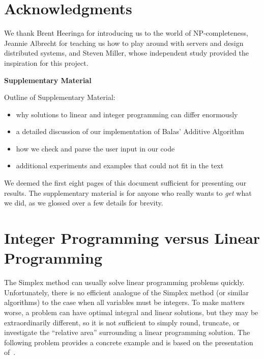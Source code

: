 \documentclass{article}
\begin{document}
\section*{Acknowledgments}
 
We thank Brent Heeringa for introducing us to the world of NP-completeness, Jeannie Albrecht for teaching us how to play around with servers and
design distributed systems, and Steven Miller, whose independent study provided the inspiration for this project.











\onecolumn

\appendix

\begin{center}
{\Large \textbf{Supplementary Material}}
\end{center}

Outline of Supplementary Material:

\begin{itemize}[noitemsep]
    \item why solutions to linear and integer programming can differ enormously
    \item a detailed discussion of our implementation of Balas' Additive Algorithm
    \item how we check and parse the user input in our code
    \item additional experiments and examples that could not fit in the text
\end{itemize}

We deemed the first eight pages of this document sufficient for presenting our results. The supplementary material is for anyone who really wants to
\emph{get} what we did, as we glossed over a few details for brevity.

\section{Integer Programming versus Linear Programming}\label{app:lin_vs_int}

The Simplex method can usually solve linear programming problems quickly. Unfortunately, there is no efficient analogue of the Simplex method (or
similar algorithms) to the case when all variables must be integers. To make matters worse, a problem can have optimal integral and linear solutions,
but they may be extraordinarily different, so it is not sufficient to simply round, truncate, or investigate the ``relative area'' surrounding a
linear programming solution. The following problem provides a concrete example and is based on the presentation of~\cite{stevenmiller}.
\end{document}
